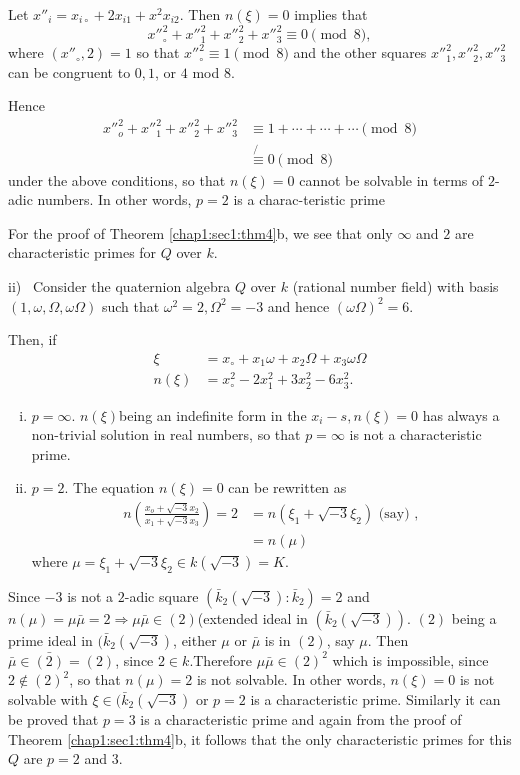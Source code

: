 Let $x''_i = x_{i\circ}+ 2 x_{i1} + x^2 x_{i2}$. Then $n(\xi) = 0$ implies that 
$$
x''^2_\circ + x''^2_1 + x''^2_2 + x''^2_3 \equiv 0 \pmod 8,
$$
where $(x''_\circ,2) =1$ so that $x''^2_\circ \equiv 1 \pmod 8$ and the
other squares $x''^2_1,  x''^2_2,x''^2_3$ can be congruent to $0,1$, or
$4$ mod $8$.  

Hence 
\begin{align*}
  x''^2_o + x''^2_1 + x''^2_2 + x''^2_3 & \equiv 1+ \cdots + \cdots+
  \cdots \pmod8\\ 
  & \not{\equiv} 0 \pmod  8 
\end{align*}  
under the above conditions, so that $n(\xi)=0$ cannot be solvable in
terms of $2$-adic numbers. In other words, $p=2$ is a
charac-teristic prime  

For the proof of Theorem \ref{chap1:sec1:thm4}b, we see that only
$\infty$ and $2$ are characteristic primes for $Q$ over $k$. 


ii)~ Consider the quaternion algebra $Q$ over $k$ (rational number field)
with basis $(1, \omega, \Omega, \omega \Omega) $ such that $\omega^2 =
2, \Omega^2 = -3$ and hence $(\omega \Omega)^2 = 6$. 

Then, if 
\begin{align*}
  \xi & = x_\circ + x_1 \omega + x_2 \Omega + x_3 \omega \Omega\\
  n (\xi) &=  x^2_\circ- 2x^2_1 + 3 x^2_2 - 6 x^2_3.
\end{align*}

\begin{enumerate}[i)]
\item $ p = \infty$. $n(\xi)$\pageoriginale being an indefinite form in the $x_i - s,
  n(\xi) =0$ has always a non-trivial solution in real numbers, so
  that $p =\infty$ is not a characteristic prime. 
\item $p = 2$. The equation $n(\xi)=0$ can be rewritten as 
  \begin{align*}
    n\left( \frac{x_o + \sqrt{-3}x_2}{x_1 + \sqrt{-3}x_3} \right)= 2 &
    = n\left(\xi_1 +  \sqrt{-3} \xi_2\right) \text{ (say) },\\ 
    &= n(\mu)
  \end{align*}
  where \hspace{1cm}$\mu = \xi_1 +  \sqrt{-3} \xi_2 \in k ( \sqrt{-3}) =K$.
\end{enumerate}

Since $-3$ is not a $2$-adic square $(\bar{k}_2( \sqrt{-3}) :
\bar{k}_2)=2$ and $n(\mu) = \mu \bar{\mu}= 2 \Longrightarrow \mu
\bar{\mu} \in (2)$(extended ideal in $(\bar{k}_2( \sqrt{-3}))$. $(2)$
being a prime ideal in $(\bar{k}_2( \sqrt{-3})$, either $\mu$ or
$\bar{\mu}$ is in $(2)$, say $\mu$. Then $\bar{\mu} \in \bar{(2)}= (2)$,
since $2 \in k$.Therefore $\mu \bar{\mu} \in (2)^2$ which is
impossible, since $2 \notin (2)^2$, so that $n (\mu) = 2$ is not
solvable. In other words, $n(\xi)=0$ is not solvable with $ \xi \in
(\bar{k}_2( \sqrt{-3})$ or $p=2$ is a characteristic prime. Similarly
it can be proved that $p=3$ is a characteristic prime and again from
the proof of Theorem \ref{chap1:sec1:thm4}b, it follows that the only characteristic
primes for this $Q$ are $p =2$ and $3$. 

